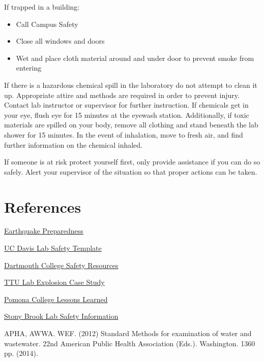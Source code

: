 \documentclass[12pt]{../SOP4_alpha}\usepackage[]{graphicx}\usepackage[]{color}
\begin{document}
\NP If trapped in a building:
\begin{itemize}
  \item Call Campus Safety
  \item Close all windows and doors\
  \item Wet and place cloth material around and under door to prevent smoke from entering
\end{itemize}

\NP If there is a hazardous chemical spill in the laboratory do not attempt to clean it up.  Appropriate attire and methods are required in order to prevent injury.  Contact lab instructor or supervisor for further instruction. If chemicals get in your eye, flush eye for 15 minutes at the eyewash station.  Additionally, if toxic materials are spilled on your body, remove all clothing and stand beneath the lab shower for 15 minutes. In the event of inhalation, move to fresh air, and find further information on the chemical inhaled.  

\NP If someone is at risk protect yourself first, only provide assistance if you can do so safely.  Alert your supervisor of the situation so that proper actions can be taken.

\section{References}

\NP \href{http://emergency.cdc.gov/disasters/earthquakes/prepared.asp}{Earthquake Preparedness}

\NP \href{http://safetyservices.ucdavis.edu/sites/default/files/documents/LabSafetyPlan_Template.docx}{UC Davis Lab Safety Template}

\NP \href{https://www.dartmouth.edu/~chemlab/info/safety/hazards.html}{Dartmouth College Safety Resources}

\NP \href{http://www.csb.gov/file.aspx?DocumentId=420}{TTU Lab Explosion Case Study}

\NP \href{https://sakai.claremont.edu/access/content/group/CX_mtg_87013/Project%201%3A%20Lab%20and%20Field%20Safety/Lessons%20Learned/Lesson_Learned_Report.pdf}{Pomona College Lessons Learned}

\NP \href{https://ehs.stonybrook.edu/programs/laboratory-safety}{Stony Brook Lab Safety Information}

\NP APHA, AWWA. WEF. (2012) Standard Methods for examination of water and wastewater. 22nd American Public Health Association (Eds.). Washington. 1360 pp. (2014).
\end{document}
